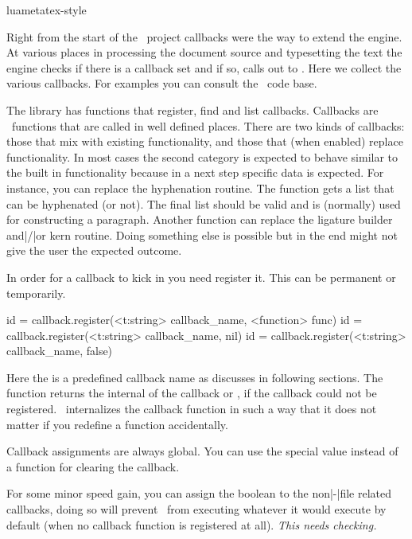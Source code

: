 
\environment luametatex-style

\startdocument[title=Callbacks]

\startsection[title={Introduction}]

Right from the start of the \LUATEX\ project callbacks were the way to extend the
engine. At various places in processing the document source and typesetting the
text the engine checks if there is a callback set and if so, calls out to \LUA.
Here we collect the various callbacks. For examples you can consult the \CONTEXT\
code base.

The  library has functions that register, find and list
callbacks. Callbacks are \LUA\ functions that are called in well defined places.
There are two kinds of callbacks: those that mix with existing functionality, and
those that (when enabled) replace functionality. In most cases the second
category is expected to behave similar to the built in functionality because in a
next step specific data is expected. For instance, you can replace the
hyphenation routine. The function gets a list that can be hyphenated (or not).
The final list should be valid and is (normally) used for constructing a
paragraph. Another function can replace the ligature builder and|/|or kern
routine. Doing something else is possible but in the end might not give the user
the expected outcome.

In order for a callback to kick in you need register it. This can be permanent or
temporarily.

\starttyping[option=LUA]
id = callback.register(<t:string> callback_name, <function> func)
id = callback.register(<t:string> callback_name, nil)
id = callback.register(<t:string> callback_name, false)
\stoptyping

Here the  is a predefined callback name as discusses in
following sections. The function returns the internal \type {id} of the callback
or \type {nil}, if the callback could not be registered. \LUAMETATEX\
internalizes the callback function in such a way that it does not matter if you
redefine a function accidentally.

Callback assignments are always global. You can use the special value 
instead of a function for clearing the callback.

For some minor speed gain, you can assign the boolean  to the
non|-|file related callbacks, doing so will prevent \LUATEX\ from executing
whatever it would execute by default (when no callback function is registered at
all). {\em This needs checking.}

